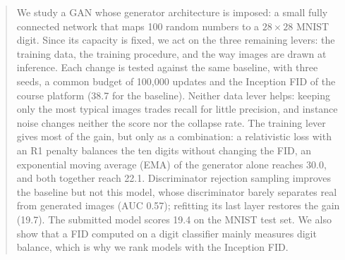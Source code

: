 \begin{abstract}
We study a GAN whose generator architecture is imposed: a small fully connected network that maps 100 random numbers to a $28\times28$ MNIST digit. Since its capacity is fixed, we act on the three remaining levers: the training data, the training procedure, and the way images are drawn at inference. Each change is tested against the same baseline, with three seeds, a common budget of 100,000 updates and the Inception FID of the course platform (38.7 for the baseline). Neither data lever helps: keeping only the most typical images trades recall for little precision, and instance noise changes neither the score nor the collapse rate. The training lever gives most of the gain, but only as a combination: a relativistic loss with an R1 penalty balances the ten digits without changing the FID, an exponential moving average (EMA) of the generator alone reaches 30.0, and both together reach 22.1. Discriminator rejection sampling improves the baseline but not this model, whose discriminator barely separates real from generated images (AUC 0.57); refitting its last layer restores the gain (19.7). The submitted model scores 19.4 on the MNIST test set. We also show that a FID computed on a digit classifier mainly measures digit balance, which is why we rank models with the Inception FID.
\end{abstract}
